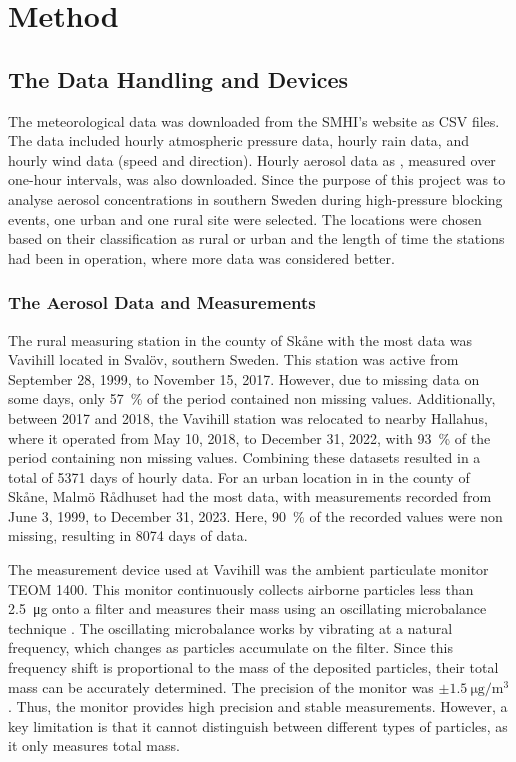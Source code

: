 \newpage
\section{Method}
\subsection{The Data Handling and Devices}
The meteorological data was downloaded from the SMHI’s website as CSV files. The data included hourly atmospheric pressure data, hourly rain data, and hourly wind data (speed and direction). Hourly aerosol data as \PM, measured over one-hour intervals, was also downloaded. Since the purpose of this project was to analyse aerosol concentrations in southern Sweden during high-pressure blocking events, one urban and one rural site were selected. The locations were chosen based on their classification as rural or urban and the length of time the stations had been in operation, where more data was considered better. 

\subsubsection{The Aerosol Data and Measurements}
The rural measuring station in the county of Skåne with the most data was Vavihill located in Svalöv, southern Sweden. This station was active from September 28, 1999, to November 15, 2017. However, due to missing data on some days, only \SI{57}{\%} of the period contained non missing values. Additionally, between 2017 and 2018, the Vavihill station was relocated to nearby Hallahus, where it operated from May 10, 2018, to December 31, 2022, with \SI{93}{\%} of the period containing non missing values. Combining these datasets resulted in a total of \SI{5371}{} days of hourly data. For an urban location in in the county of Skåne, Malmö Rådhuset had the most data, with measurements recorded from June 3, 1999, to December 31, 2023. Here, \SI{90}{\%} of the recorded values were non missing, resulting in \SI{8074}{} days of data. 

The measurement device used at Vavihill was the ambient particulate monitor TEOM 1400. This monitor continuously collects airborne particles less than \SI{2.5}{\micro\g} onto a filter and measures their mass using an oscillating microbalance technique \cite{thermofisherscientificinc.TEOMSeries1400a2007}. The oscillating microbalance works by vibrating at a natural frequency, which changes as particles accumulate on the filter. Since this frequency shift is proportional to the mass of the deposited particles, their total mass can be accurately determined. The precision of the monitor was $\pm\SI{1.5}{\micro\gram\per\meter\cubed}$. Thus, the monitor provides high precision and stable measurements. However, a key limitation is that it cannot distinguish between different types of particles, as it only measures total mass.

